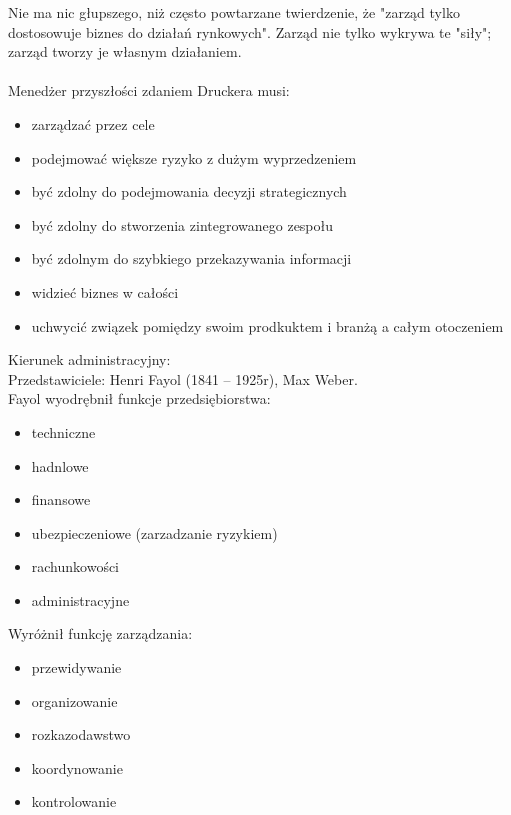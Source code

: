 \documentclass[a4paper,10pt]{report}
\begin{document}
Nie ma nic głupszego, niż często powtarzane twierdzenie, że "zarząd tylko dostosowuje biznes do działań rynkowych". Zarząd nie tylko wykrywa te "siły"; zarząd tworzy je własnym działaniem.
\\ \\
Menedżer przyszłości zdaniem Druckera musi:
\begin{itemize}
	\item zarządzać przez cele
	\item podejmować większe ryzyko z dużym wyprzedzeniem
	\item być zdolny do podejmowania decyzji strategicznych
	\item być zdolny do stworzenia zintegrowanego zespołu
	\item być zdolnym do szybkiego przekazywania informacji
	\item widzieć biznes w całości
	\item uchwycić związek pomiędzy swoim prodkuktem i branżą a całym otoczeniem
\end{itemize}

Kierunek administracyjny:\\
Przedstawiciele: Henri Fayol (1841 -- 1925r), Max Weber.\\

Fayol wyodrębnił funkcje przedsiębiorstwa:
\begin{itemize}
	\item techniczne
	\item hadnlowe
	\item finansowe
	\item ubezpieczeniowe (zarzadzanie ryzykiem)
	\item rachunkowości
	\item administracyjne
\end{itemize}

Wyróżnił funkcję zarządzania:
\begin{itemize}
	\item przewidywanie
	\item organizowanie
	\item rozkazodawstwo
	\item koordynowanie
	\item kontrolowanie
\end{itemize}
\end{document}
